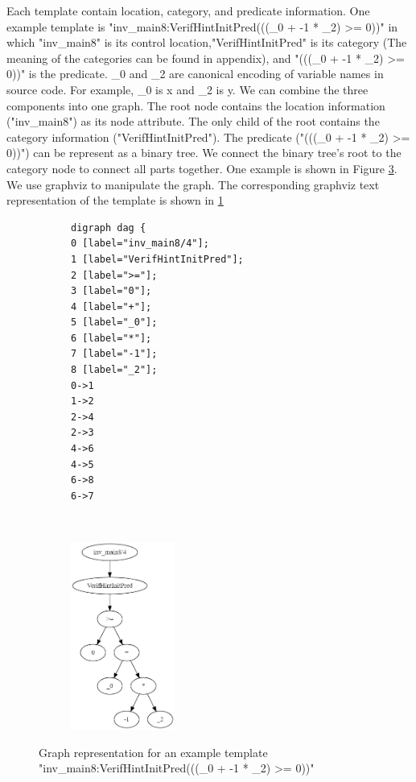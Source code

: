 \documentclass{article}
\begin{document}
Each template contain location, category, and predicate information. One example template is "inv\_main8:VerifHintInitPred(((\_0 + -1 * \_2) >= 0))" in which "inv\_main8" is its control location,"VerifHintInitPred" is its category (The meaning of the categories can be found in appendix), and "(((\_0 + -1 * \_2) >= 0))" is the predicate. \_0 and \_2 are canonical encoding of variable names in source code. For example, \_0 is x and \_2 is y.  We can combine the three components into one graph. The root node contains the location information ("inv\_main8") as its node attribute. The only child of the root contains the category information ("VerifHintInitPred"). The predicate ("(((\_0 + -1 * \_2) >= 0))") can be represent as a binary tree. We connect the binary tree's root to the category node to connect all parts together. One example is shown in Figure \ref{templateGraph}. We use graphviz to manipulate the graph. The corresponding graphviz text representation of the template is shown in \ref{templateGraphviz}
\begin{figure}[h]
\centering
\begin{subfigure}{0.3\textwidth}
\begin{lstlisting}
digraph dag {
0 [label="inv_main8/4"];
1 [label="VerifHintInitPred"];
2 [label=">="];
3 [label="0"];
4 [label="+"];
5 [label="_0"];
6 [label="*"];
7 [label="-1"];
8 [label="_2"];
0->1
1->2
2->4
2->3
4->6
4->5
6->8
6->7
\end{lstlisting}\label{templateGraphviz}
\end{subfigure}   ~~~~~~~~~~~~
\begin{subfigure}{0.3\textwidth}
  \includegraphics[width=3.4cm]{graph/template_graph}\\
  \label{templateGraph}
  \end{subfigure}
  \caption{Graph representation for an example template "inv\_main8:VerifHintInitPred(((\_0 + -1 * \_2) >= 0))"}
\end{figure}
\end{document}

